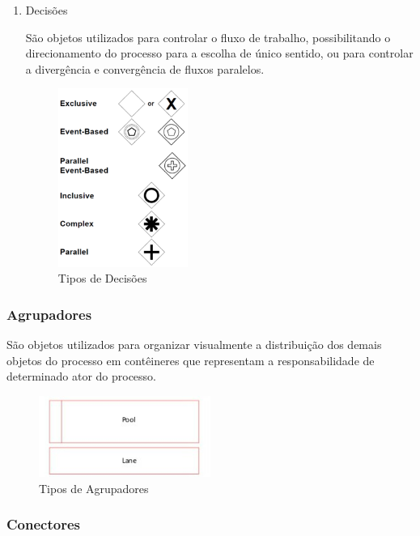 \begin{enumerate}
    \item Decisões
    
    São objetos utilizados para controlar o fluxo de trabalho, possibilitando o direcionamento do processo para a escolha de único sentido, ou para controlar a divergência e convergência de fluxos paralelos.
    
    \begin{figure}[H]
    \centering
    \includegraphics[width=0.4\textwidth]{imagens/bpmn_gateways.png}
    \caption{Tipos de Decisões}
    \label{fig:bpmn_gateways}
    \end{figure}
\end{enumerate}


\subsubsection{Agrupadores}\label{sec:activiti-bpmn_objetos_agrupadores}

    São objetos utilizados para organizar visualmente a distribuição dos demais objetos do processo em contêineres que representam a responsabilidade de determinado ator do processo.

    \begin{figure}[H]
    \centering
    \includegraphics[width=0.5\textwidth]{imagens/bpmn_swimlanes.jpg}
    \caption{Tipos de Agrupadores}
    \label{fig:bpmn_swimlanes}
    \end{figure}

\subsubsection{Conectores}\label{sec:activiti-bpmn_objetos_conectores}

